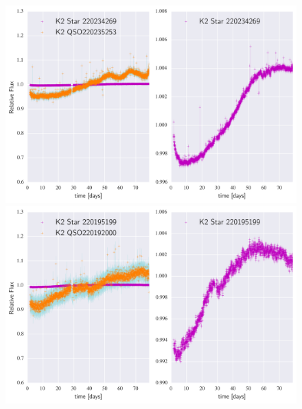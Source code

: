 \documentclass[a4paper,fleqn,usenatbib]{mnras}
\begin{document}
        	\begin{figure}
 	\includegraphics[width=\columnwidth]{220235253NearestNeighbor.png}
 	\includegraphics[width=\columnwidth]{220192000NearestNeighbor.png}
        	\caption{}
        	\label{fig:example_figure}
        	\end{figure}    
        	
         
\end{document}
